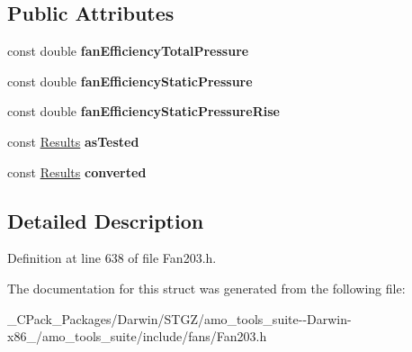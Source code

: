 \subsection*{Public Attributes}
\begin{DoxyCompactItemize}
\item 
\mbox{\label{struct_fan203_1_1_output_a1c693f72537a3b09c5675e9597582b99}} 
const double {\bfseries fan\+Efficiency\+Total\+Pressure}
\item 
\mbox{\label{struct_fan203_1_1_output_a3ed8a45f96d2c0d59f5c4780dfa706f5}} 
const double {\bfseries fan\+Efficiency\+Static\+Pressure}
\item 
\mbox{\label{struct_fan203_1_1_output_a65e4c8f90e87720f09f5691a75ef34b8}} 
const double {\bfseries fan\+Efficiency\+Static\+Pressure\+Rise}
\item 
\mbox{\label{struct_fan203_1_1_output_a82901834cabb87e119d0b1186a06aeae}} 
const \hyperlink{struct_fan203_1_1_results}{Results} {\bfseries as\+Tested}
\item 
\mbox{\label{struct_fan203_1_1_output_a775ac959a1b54c2cdb2eb695fcb3ace3}} 
const \hyperlink{struct_fan203_1_1_results}{Results} {\bfseries converted}
\end{DoxyCompactItemize}


\subsection{Detailed Description}


Definition at line 638 of file Fan203.\+h.



The documentation for this struct was generated from the following file\+:\begin{DoxyCompactItemize}
\item 
\+\_\+\+C\+Pack\+\_\+\+Packages/\+Darwin/\+S\+T\+G\+Z/amo\+\_\+tools\+\_\+suite-\/-\/\+Darwin-\/x86\+\_/amo\+\_\+tools\+\_\+suite/include/fans/Fan203.\+h\end{DoxyCompactItemize}
